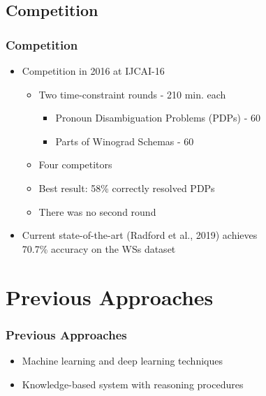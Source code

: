 \documentclass[c,8pt,xcolor...,x11names]{beamer}
\begin{document}
\subsection{Competition}

\begin{frame}
\frametitle{Competition}
	\begin{itemize}
	\normalsize
	\item Competition in 2016 at IJCAI-16
	\begin{itemize}
		\normalsize
		\item Two time-constraint rounds - 210 min. each
		\begin{itemize}
			\normalsize
			\item Pronoun Disambiguation Problems (PDPs) - 60
			\item Parts of Winograd Schemas - 60
		\end{itemize}
		\item Four competitors
		\item Best result: 58\% correctly resolved PDPs
		\item There was no second round
		
	\end{itemize}
	
	\item Current \alert{state-of-the-art} (Radford et al., 2019) achieves \\ 70.7\% accuracy on the WSs dataset
\end{itemize}
\end{frame}

\section{Previous Approaches}

\begin{frame}
\frametitle{Previous Approaches}
\begin{itemize}
	\item Machine learning and deep learning techniques
	\item Knowledge-based system with reasoning procedures
\end{itemize}



\end{frame}
\end{document}
